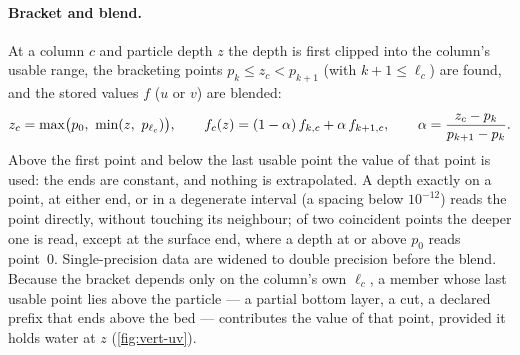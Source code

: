 \paragraph{Bracket and blend.} At a column $c$ and particle depth $z$ the depth is first clipped into the
column's usable range, the bracketing points $p_k\le z_c<p_{k+1}$ (with $k+1\le\ell_c$) are found, and
the stored values $f$ ($u$ or $v$) are blended:
\begin{equation}\label{eq:vert-uv-blend}
  z_c = \max\bigl(p_0,\ \min(z,\ p_{\ell_c})\bigr),\qquad
  f_c(z) = (1-\alpha)\,f_{k,c} + \alpha\,f_{k+1,c},\qquad
  \alpha = \frac{z_c-p_k}{p_{k+1}-p_k}.
\end{equation}
Above the first point and below the last usable point the value of that point is used: the ends are
constant, and nothing is extrapolated. A depth exactly on a point, at either end, or in a degenerate
interval (a spacing below $10^{-12}$) reads the point directly, without touching its neighbour; of two
coincident points the deeper one is read, except at the surface end, where a depth at or above $p_0$
reads point~0. Single-precision data are widened to double precision before the blend. Because the
bracket depends only on the column's own $\ell_c$, a member whose last usable point lies above the
particle --- a partial bottom layer, a  cut, a declared prefix that ends above the bed ---
contributes the value of that point, provided it holds water at $z$ (\cref{fig:vert-uv}).


